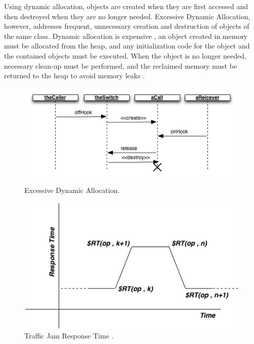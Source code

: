Using dynamic allocation, objects are created when they are first accessed and then destroyed when they are no longer needed. Excessive Dynamic Allocation, however, addresses frequent, unnecessary creation and destruction of objects of the same class. Dynamic allocation is expensive , an object created in memory must be allocated from the heap, and any initialization code for the object and the contained objects must be executed. When the object is no longer needed, necessary clean-up must be performed, and the reclaimed memory must be returned to the heap to avoid memory leaks \cite{Smith2002} \cite{Smith2003}.

\begin{figure}[H]
\begin{minipage}{.5\textwidth}
\centering
\includegraphics[width=1\textwidth]{./images/excessivedynamicallocation.png}
\caption{Excessive Dynamic Allocation.}
\label{fig:dynallocation}
\end{minipage}
\begin{minipage}{.5\textwidth}
\centering
\includegraphics[width=1\textwidth]{./images/jam.png}
\caption{Traffic Jam Response Time \cite{Vetoio2011}.}
\label{fig:jam}
\end{minipage}
\end{figure}

